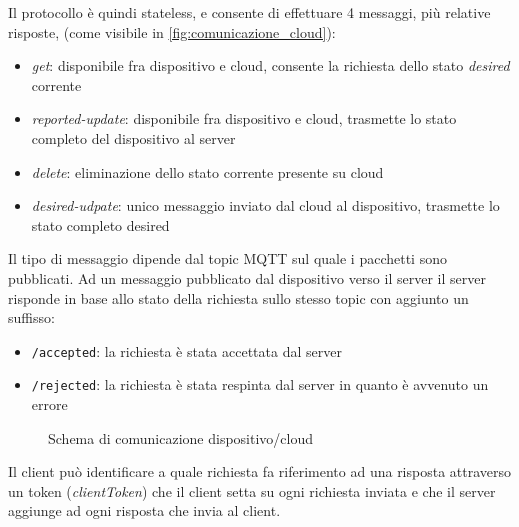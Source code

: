 \documentclass[12pt,a4paper,twoside,titlepage]{book}
\begin{document}
Il protocollo è quindi stateless, e consente di effettuare 4 messaggi, più relative risposte,
(come visibile in \autoref{fig:comunicazione_cloud}):

\begin{itemize}
    \item \textit{get}: disponibile fra dispositivo e cloud, consente la richiesta dello stato \textit{desired} corrente
    \item \textit{reported-update}: disponibile fra dispositivo e cloud, trasmette lo stato
        completo del dispositivo al server
    \item \textit{delete}: eliminazione dello stato corrente presente su cloud
    \item \textit{desired-udpate}: unico messaggio inviato dal cloud al dispositivo,
        trasmette lo stato completo desired
\end{itemize}

Il tipo di messaggio dipende dal topic MQTT sul quale i pacchetti sono pubblicati. Ad
un messaggio pubblicato dal dispositivo verso il server il server risponde in base allo
stato della richiesta sullo stesso topic con aggiunto un suffisso:
\begin{itemize}
    \item \texttt{/accepted}: la richiesta è stata accettata dal server
    \item \texttt{/rejected}: la richiesta è stata respinta dal server in quanto è 
        avvenuto un errore
\end{itemize}

\begin{figure}[ht]
    \centering
    \caption{Schema di comunicazione dispositivo/cloud}
    \label{fig:comunicazione_cloud}
\end{figure}

Il client può identificare a quale richiesta fa riferimento ad una risposta attraverso un
token (\textit{clientToken}) che il client setta su ogni richiesta inviata e che il server aggiunge
ad ogni risposta che invia al client.
\end{document}
